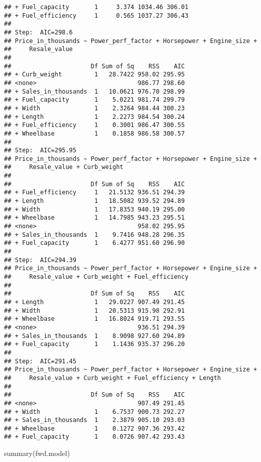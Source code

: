 \documentclass[
]{article}
\newenvironment{Shaded}{\begin{snugshade}}{\end{snugshade}}
\newcommand{\FunctionTok}[1]{\textcolor[rgb]{0.00,0.00,0.00}{#1}}
\newcommand{\NormalTok}[1]{#1}
\begin{document}
\begin{verbatim}
## + Fuel_capacity       1     3.374 1034.46 306.01
## + Fuel_efficiency     1     0.565 1037.27 306.43
## 
## Step:  AIC=298.6
## Price_in_thousands ~ Power_perf_factor + Horsepower + Engine_size + 
##     Resale_value
## 
##                      Df Sum of Sq    RSS    AIC
## + Curb_weight         1   28.7422 958.02 295.95
## <none>                            986.77 298.60
## + Sales_in_thousands  1   10.0621 976.70 298.99
## + Fuel_capacity       1    5.0221 981.74 299.79
## + Width               1    2.3264 984.44 300.23
## + Length              1    2.2273 984.54 300.24
## + Fuel_efficiency     1    0.3001 986.47 300.55
## + Wheelbase           1    0.1858 986.58 300.57
## 
## Step:  AIC=295.95
## Price_in_thousands ~ Power_perf_factor + Horsepower + Engine_size + 
##     Resale_value + Curb_weight
## 
##                      Df Sum of Sq    RSS    AIC
## + Fuel_efficiency     1   21.5132 936.51 294.39
## + Length              1   18.5082 939.52 294.89
## + Width               1   17.8353 940.19 295.00
## + Wheelbase           1   14.7985 943.23 295.51
## <none>                            958.02 295.95
## + Sales_in_thousands  1    9.7416 948.28 296.35
## + Fuel_capacity       1    6.4277 951.60 296.90
## 
## Step:  AIC=294.39
## Price_in_thousands ~ Power_perf_factor + Horsepower + Engine_size + 
##     Resale_value + Curb_weight + Fuel_efficiency
## 
##                      Df Sum of Sq    RSS    AIC
## + Length              1   29.0227 907.49 291.45
## + Width               1   20.5313 915.98 292.91
## + Wheelbase           1   16.8024 919.71 293.55
## <none>                            936.51 294.39
## + Sales_in_thousands  1    8.9098 927.60 294.89
## + Fuel_capacity       1    1.1436 935.37 296.20
## 
## Step:  AIC=291.45
## Price_in_thousands ~ Power_perf_factor + Horsepower + Engine_size + 
##     Resale_value + Curb_weight + Fuel_efficiency + Length
## 
##                      Df Sum of Sq    RSS    AIC
## <none>                            907.49 291.45
## + Width               1    6.7537 900.73 292.27
## + Sales_in_thousands  1    2.3879 905.10 293.03
## + Wheelbase           1    0.1272 907.36 293.42
## + Fuel_capacity       1    0.0726 907.42 293.43
\end{verbatim}

\begin{Shaded}
\begin{Highlighting}[]
\FunctionTok{summary}\NormalTok{(fwd.model)}
\end{Highlighting}
\end{Shaded}
\end{document}
